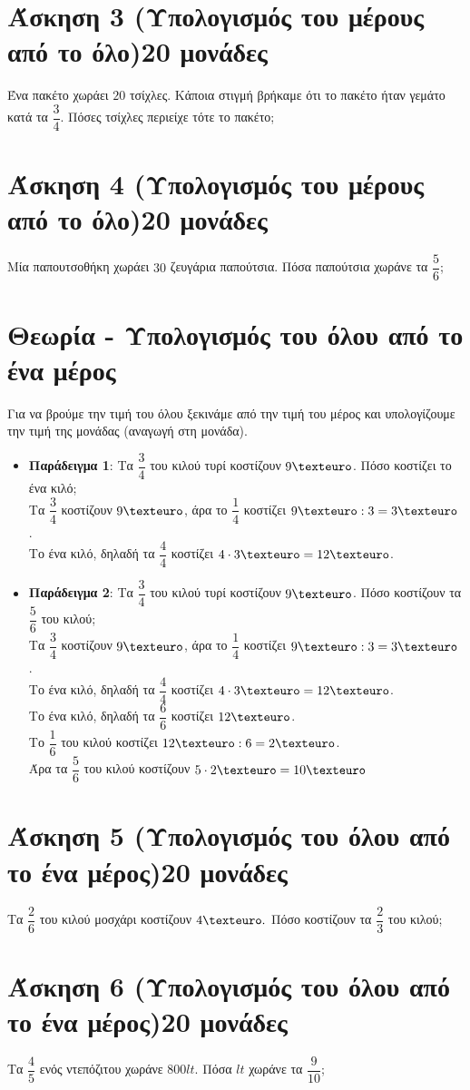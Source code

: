 \documentclass[a4paper,10pt]{report}
\begin{document}
\section*{Άσκηση 3 (Υπολογισμός του μέρους από το όλο)\hfill \small{20 μονάδες}}
Ένα πακέτο χωράει $20$ τσίχλες. Κάποια στιγμή βρήκαμε ότι το πακέτο ήταν γεμάτο κατά τα $\dfrac{3}{4}$. 
Πόσες τσίχλες περιείχε τότε το πακέτο;


\section*{Άσκηση 4 (Υπολογισμός του μέρους από το όλο)\hfill \small{20 μονάδες}}
Μία παπουτσοθήκη χωράει $30$ ζευγάρια παπούτσια. Πόσα παπούτσια χωράνε τα  $\dfrac{5}{6}$; 



\section*{Θεωρία - Υπολογισμός του όλου από το ένα μέρος \hfill \small{}}
Για να βρούμε την τιμή του όλου ξεκινάμε από την τιμή του μέρος και υπολογίζουμε  την τιμή της μονάδας 
(αναγωγή στη μονάδα).
\begin{itemize}
 \item \textbf{Παράδειγμα 1}: Τα $\dfrac{3}{4}$ του κιλού τυρί κοστίζουν $9\texteuro$. Πόσο κοστίζει το ένα κιλό;\\
       Τα $\dfrac{3}{4}$ κοστίζουν $9\texteuro$, άρα το $\dfrac{1}{4}$ κοστίζει $9\texteuro:3=3\texteuro$ .\\
       Το ένα κιλό, δηλαδή τα $\dfrac{4}{4}$ κοστίζει $4\cdot 3\texteuro=12\texteuro$.\\
 \item \textbf{Παράδειγμα 2}: Τα $\dfrac{3}{4}$ του κιλού τυρί κοστίζουν $9\texteuro$. 
        Πόσο κοστίζουν τα $\dfrac{5}{6}$ του κιλού;   \\
       Τα $\dfrac{3}{4}$ κοστίζουν $9\texteuro$, άρα το $\dfrac{1}{4}$ κοστίζει $9\texteuro:3=3\texteuro$ .\\
       Το ένα κιλό, δηλαδή τα $\dfrac{4}{4}$ κοστίζει $4\cdot 3\texteuro=12\texteuro$.\\
       Το ένα κιλό, δηλαδή τα $\dfrac{6}{6}$ κοστίζει $12\texteuro$.\\
       Το $\dfrac{1}{6}$ του κιλού κοστίζει $12\texteuro :6=2\texteuro$.\\
       Άρα τα $\dfrac{5}{6}$ του κιλού κοστίζουν $5\cdot 2\texteuro=10\texteuro$
\end{itemize}

\section*{Άσκηση 5 (Υπολογισμός του όλου από το ένα μέρος)\hfill \small{20 μονάδες}}
Τα $\dfrac{2}{6}$ του κιλού μοσχάρι κοστίζουν $4\texteuro.$ Πόσο κοστίζουν τα $\dfrac{2}{3}$ του κιλού;


\section*{Άσκηση 6 (Υπολογισμός του όλου από το ένα μέρος)\hfill \small{20 μονάδες}}
Τα $\dfrac{4}{5}$ ενός ντεπόζιτου χωράνε  $800lt$. Πόσα $lt$ χωράνε τα $\dfrac{9}{10}$;
\end{document}
